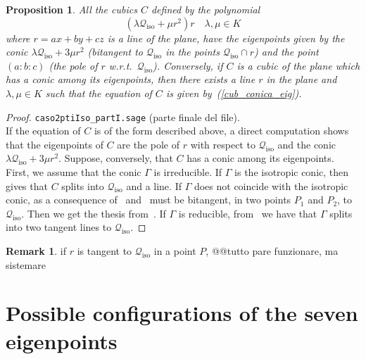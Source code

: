 \documentclass{amsart}
\theoremstyle{plain}
\newtheorem{prop}[lemma]{Proposition}
\theoremstyle{definition}
\newtheorem{rmk}[lemma]{Remark}
\newcommand{\iso}{\mathcal{Q}_{\mathrm{iso}}}
\begin{document}
\begin{prop} All the cubics $C$ defined by the polynomial
\begin{equation}
\label{cub_conica_eig}
(\lambda \iso + \mu r^2)r \quad \mbox{$\lambda, \mu \in K$}
\end{equation}
where $r=ax+by+cz$ is a line of the plane,
have the eigenpoints given by the conic
$\lambda \iso+3\mu r^2$ (bitangent to $\iso$ in the points $\iso \cap r$)
and the point $(a:b:c)$ (the pole of $r$
w.r.t.\ $\iso$). Conversely, if
$C$ is a cubic of the plane which has a conic among its eigenpoints,
then there exists a line $r$ in the plane and $\lambda, \mu \in K$
such that the equation of
$C$ is given by~(\ref{cub_conica_eig}).
\end{prop}
\begin{proof}
\verb+caso2ptiIso_partI.sage+ (parte finale del file).\\
If the equation of $C$ is of the form described above, a direct computation
shows that the eigenpoints of $C$ are the pole of $r$ with respect to $\iso$
and the conic $\lambda \iso+3\mu r^2$. Suppose, conversely, that $C$ has
a conic among its eigenpoints. First, we assume that the conic $\Gamma$
is irreducible. If $\Gamma$ is the isotropic conic,
then~ gives that $C$ splits into $\iso$ and a line.
If $\Gamma$ does not coincide with the
isotropic conic, as a consequence
of~ and~ must be bitangent,
in two points $P_1$ and $P_2$, to $\iso$. Then we get the thesis
from~. If $\Gamma$ is reducible,
from~  we have that $\Gamma$ splits
into two tangent lines to $\iso$.
\end{proof}
\begin{rmk}
if $r$ is tangent to $\iso$ in a point $P$, @@tutto pare funzionare,
ma sistemare
\end{rmk}



\section{Possible configurations of the seven eigenpoints}
\label{further_alignments}
\end{document}
